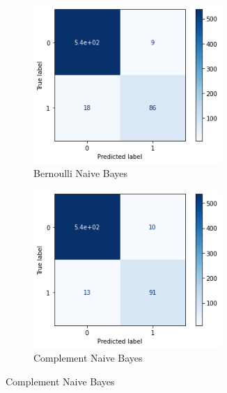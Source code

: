 \begin{figure}[H]
    \begin{subfigure}{0.5\textwidth}
        \includegraphics[width=0.9\linewidth, height=6cm]{img/cm/bnb.png}
        \caption{Bernoulli Naive Bayes}
        \label{fig:bnb}
    \end{subfigure}
    \begin{subfigure}{0.5\textwidth}
        \includegraphics[width=0.9\linewidth, height=6cm]{img/cm/cnb.png}
        \caption{Complement Naive Bayes}
        \label{fig:cnb}
    \end{subfigure}
\end{figure}
